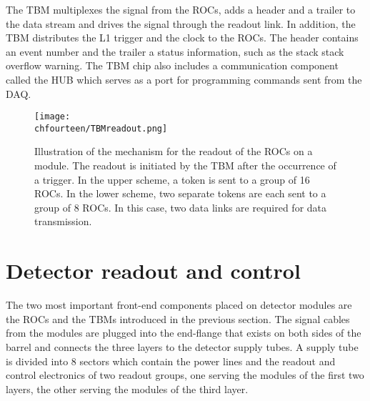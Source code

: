 The TBM multiplexes the signal from the ROCs, adds a header and a trailer to the data stream and drives the signal through the readout link. In addition, the TBM distributes the L1 trigger and the clock to the ROCs.
The header contains an event number and the trailer a status information, such as the stack stack overflow warning.
The TBM chip also includes a communication component called the HUB which serves as a port for programming commands sent from the DAQ.

\begin{figure}[!htb]
 \begin{center}
 \texttt{[image: \\chfourteen/TBMreadout.png]}
 \end{center}
 \caption{Illustration of the mechanism for the readout of the ROCs on a module. The readout is initiated by the TBM after the occurrence of a trigger. In the upper scheme, a token is sent to a group of 16 ROCs.
 In the lower scheme, two separate tokens are each sent to a group of 8 ROCs. In this case, two data links are required for data transmission.}
 \label{fig:TBMreadout}
\end{figure}

\section{Detector readout and control}\label{sec:BPix_DAQ}

The two most important front-end components placed on detector modules are the ROCs and the TBMs introduced in the previous section. 
The signal cables from the modules are plugged into the end-flange that exists on both sides of the barrel and connects the three layers to the detector supply tubes. 
A supply tube is divided into 8 sectors which contain the power lines and the readout and control electronics of two readout groups, one serving the modules of the first two layers, the other serving the modules of the third layer.

